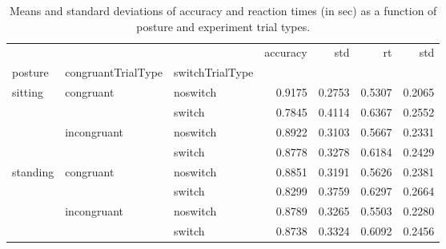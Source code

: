 \begin{table}
\centering
\caption{Means and standard deviations of accuracy and reaction times (in sec) as a function of posture and experiment trial types.}
\label{table-task-switching-replication-reaction-time}
\begin{tabular}{lllrrrr}
\toprule
         &             &        & accuracy &    std &     rt &    std \\
posture & congruantTrialType & switchTrialType &          &        &        &        \\
\midrule
sitting & congruant & noswitch &   0.9175 & 0.2753 & 0.5307 & 0.2065 \\
         &             & switch &   0.7845 & 0.4114 & 0.6367 & 0.2552 \\
         & incongruant & noswitch &   0.8922 & 0.3103 & 0.5667 & 0.2331 \\
         &             & switch &   0.8778 & 0.3278 & 0.6184 & 0.2429 \\
standing & congruant & noswitch &   0.8851 & 0.3191 & 0.5626 & 0.2381 \\
         &             & switch &   0.8299 & 0.3759 & 0.6297 & 0.2664 \\
         & incongruant & noswitch &   0.8789 & 0.3265 & 0.5503 & 0.2280 \\
         &             & switch &   0.8738 & 0.3324 & 0.6092 & 0.2456 \\
\bottomrule
\end{tabular}
\end{table}
